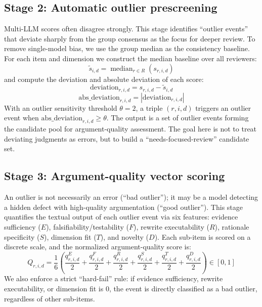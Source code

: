 \documentclass[sn-mathphys-num]{sn-jnl}
\begin{document}
\subsection{Stage 2: Automatic outlier prescreening}
Multi-LLM scores often disagree strongly. This stage identifies ``outlier events'' that deviate sharply from the group consensus as the focus for deeper review. To remove single-model bias, we use the group median as the consistency baseline. For each item and dimension we construct the median baseline over all reviewers:
\begin{equation}
\tilde{s}_{i,d} = \operatorname{median}_{r \in R}\!\left(s_{r,i,d}\right)
\label{eq:median}
\end{equation}
and compute the deviation and absolute deviation of each score:
\begin{equation}
\mathrm{deviation}_{r,i,d} = s_{r,i,d} - \tilde{s}_{i,d}
\label{eq:deviation}
\end{equation}
\begin{equation}
\mathrm{abs\_deviation}_{r,i,d} = \left| \mathrm{deviation}_{r,i,d} \right|
\label{eq:absdev}
\end{equation}
With an outlier sensitivity threshold $\theta=2$, a triple $(r,i,d)$ triggers an outlier event when $\mathrm{abs\_deviation}_{r,i,d}\ge\theta$. The output is a set of outlier events forming the candidate pool for argument-quality assessment. The goal here is not to treat deviating judgments as errors, but to build a ``needs-focused-review'' candidate set.

\subsection{Stage 3: Argument-quality vector scoring}
An outlier is not necessarily an error (``bad outlier''); it may be a model detecting a hidden defect with high-quality argumentation (``good outlier''). This stage quantifies the textual output of each outlier event via six features: evidence sufficiency ($E$), falsifiability/testability ($F$), rewrite executability ($R$), rationale specificity ($S$), dimension fit ($T$), and novelty ($D$). Each sub-item is scored on a discrete scale, and the normalized argument-quality score is:
\begin{equation}
Q_{r,i,d} = \frac{1}{6}\left(
\frac{q^{E}_{r,i,d}}{2} + \frac{q^{F}_{r,i,d}}{2} + \frac{q^{R}_{r,i,d}}{2}
+ \frac{q^{S}_{r,i,d}}{2} + \frac{q^{T}_{r,i,d}}{2} + \frac{q^{D}_{r,i,d}}{2}
\right) \in [0,1]
\label{eq:Q}
\end{equation}
We also enforce a strict ``hard-fail'' rule: if evidence sufficiency, rewrite executability, or dimension fit is $0$, the event is directly classified as a bad outlier, regardless of other sub-items.
\end{document}
